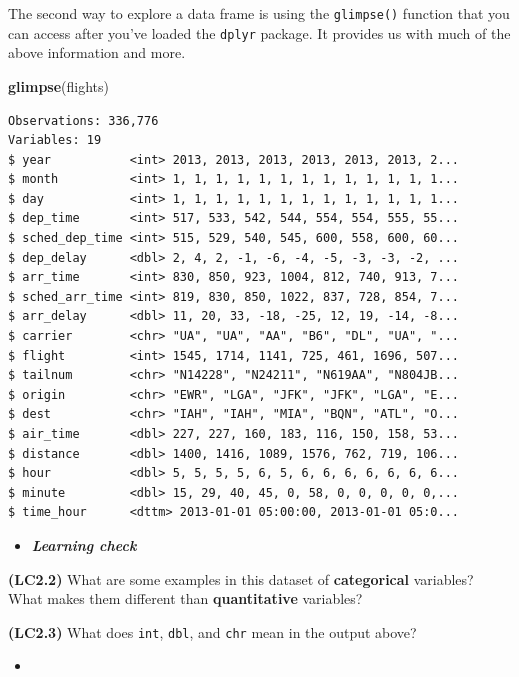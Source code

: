 \documentclass[12pt,]{krantz}
\makeatletter
\newenvironment{Shaded}{\begin{snugshade}}{\end{snugshade}}
\newcommand{\KeywordTok}[1]{\textcolor[rgb]{0.27,0.27,0.27}{\textbf{#1}}}
\newcommand{\NormalTok}[1]{#1}
\newenvironment{kframe}{%
\medskip{}
\setlength{\fboxsep}{.8em}
 \def\at@end@of@kframe{}%
 \ifinner\ifhmode%
  \def\at@end@of@kframe{\end{minipage}}%
  \begin{minipage}{\columnwidth}%
 \fi\fi%
 \def\FrameCommand##1{\hskip\@totalleftmargin \hskip-\fboxsep
 \colorbox{shadecolor}{##1}\hskip-\fboxsep
     \hskip-\linewidth \hskip-\@totalleftmargin \hskip\columnwidth}%
 \MakeFramed {\advance\hsize-\width
   \@totalleftmargin\z@ \linewidth\hsize
   \@setminipage}}%
 {\par\unskip\endMakeFramed%
 \at@end@of@kframe}
\renewenvironment{Shaded}{\begin{kframe}}{\end{kframe}}
\newenvironment{rmdblock}[1]
  {\begin{shaded*}
  \begin{itemize}
  \renewcommand{\labelitemi}{
    \raisebox{-.7\height}[0pt][0pt]{
    }
  }
  \item
  }
  {
  \end{itemize}
  \end{shaded*}
  }
\newenvironment{learncheck}
  {\begin{rmdblock}{warning}}
  {\end{rmdblock}}
\makeatother
\begin{document}
The second way to explore a data frame is using the \texttt{glimpse()}
function that you can access after you've loaded the \texttt{dplyr}
package. It provides us with much of the above information and more.

\begin{Shaded}
\begin{Highlighting}[]
\KeywordTok{glimpse}\NormalTok{(flights)}
\end{Highlighting}
\end{Shaded}

\begin{verbatim}
Observations: 336,776
Variables: 19
$ year           <int> 2013, 2013, 2013, 2013, 2013, 2013, 2...
$ month          <int> 1, 1, 1, 1, 1, 1, 1, 1, 1, 1, 1, 1, 1...
$ day            <int> 1, 1, 1, 1, 1, 1, 1, 1, 1, 1, 1, 1, 1...
$ dep_time       <int> 517, 533, 542, 544, 554, 554, 555, 55...
$ sched_dep_time <int> 515, 529, 540, 545, 600, 558, 600, 60...
$ dep_delay      <dbl> 2, 4, 2, -1, -6, -4, -5, -3, -3, -2, ...
$ arr_time       <int> 830, 850, 923, 1004, 812, 740, 913, 7...
$ sched_arr_time <int> 819, 830, 850, 1022, 837, 728, 854, 7...
$ arr_delay      <dbl> 11, 20, 33, -18, -25, 12, 19, -14, -8...
$ carrier        <chr> "UA", "UA", "AA", "B6", "DL", "UA", "...
$ flight         <int> 1545, 1714, 1141, 725, 461, 1696, 507...
$ tailnum        <chr> "N14228", "N24211", "N619AA", "N804JB...
$ origin         <chr> "EWR", "LGA", "JFK", "JFK", "LGA", "E...
$ dest           <chr> "IAH", "IAH", "MIA", "BQN", "ATL", "O...
$ air_time       <dbl> 227, 227, 160, 183, 116, 150, 158, 53...
$ distance       <dbl> 1400, 1416, 1089, 1576, 762, 719, 106...
$ hour           <dbl> 5, 5, 5, 5, 6, 5, 6, 6, 6, 6, 6, 6, 6...
$ minute         <dbl> 15, 29, 40, 45, 0, 58, 0, 0, 0, 0, 0,...
$ time_hour      <dttm> 2013-01-01 05:00:00, 2013-01-01 05:0...
\end{verbatim}

\begin{learncheck}
\textbf{\emph{Learning check}}
\end{learncheck}

\textbf{(LC2.2)} What are some examples in this dataset of
\textbf{categorical} variables? What makes them different than
\textbf{quantitative} variables?

\textbf{(LC2.3)} What does \texttt{int}, \texttt{dbl}, and \texttt{chr}
mean in the output above?

\begin{learncheck}

\end{learncheck}
\end{document}
